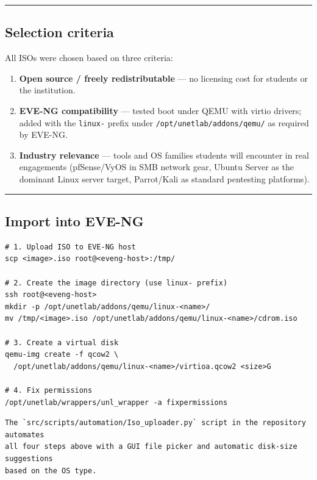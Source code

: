 \begin{center}\rule{0.5\linewidth}{0.5pt}\end{center}

\subsection{Selection criteria}

All ISOs were chosen based on three criteria:

\begin{enumerate}
\def\labelenumi{\arabic{enumi}.}
\tightlist
\item
  \textbf{Open source / freely redistributable} --- no licensing cost for students or the institution.
\item
  \textbf{EVE-NG compatibility} --- tested boot under QEMU with virtio drivers; added with the \texttt{linux-} prefix under \texttt{/opt/unetlab/addons/qemu/} as required by EVE-NG.
\item
  \textbf{Industry relevance} --- tools and OS families students will encounter in real engagements (pfSense/VyOS in SMB network gear, Ubuntu Server as the dominant Linux server target, Parrot/Kali as standard pentesting platforms).
\end{enumerate}

\begin{center}\rule{0.5\linewidth}{0.5pt}\end{center}

\subsection{Import into EVE-NG}

\begin{lstlisting}
# 1. Upload ISO to EVE-NG host
scp <image>.iso root@<eveng-host>:/tmp/

# 2. Create the image directory (use linux- prefix)
ssh root@<eveng-host>
mkdir -p /opt/unetlab/addons/qemu/linux-<name>/
mv /tmp/<image>.iso /opt/unetlab/addons/qemu/linux-<name>/cdrom.iso

# 3. Create a virtual disk
qemu-img create -f qcow2 \
  /opt/unetlab/addons/qemu/linux-<name>/virtioa.qcow2 <size>G

# 4. Fix permissions
/opt/unetlab/wrappers/unl_wrapper -a fixpermissions
\end{lstlisting}

\begin{lstlisting}
The `src/scripts/automation/Iso_uploader.py` script in the repository automates
all four steps above with a GUI file picker and automatic disk-size suggestions
based on the OS type.
\end{lstlisting}

